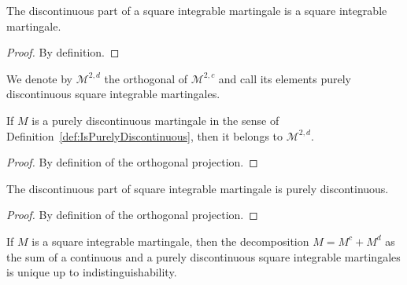 \begin{lemma}\label{lem:isSquareIntegrable_discontinuousPart}
  \leanok
The discontinuous part of a square integrable martingale is a square integrable martingale.
\end{lemma}

\begin{proof}
  \leanok
By definition.
\end{proof}


\begin{definition}\label{def:discontinuousSquareIntegrable}
  \leanok
We denote by $\mathcal{M}^{2,d}$ the orthogonal of $\mathcal{M}^{2,c}$ and call its elements purely discontinuous square integrable martingales.
\end{definition}


\begin{lemma}\label{lem:mem_discontinuousSquareIntegrable}
  \leanok
If $M$ is a purely discontinuous martingale in the sense of Definition~\ref{def:IsPurelyDiscontinuous}, then it belongs to $\mathcal{M}^{2,d}$.
\end{lemma}

\begin{proof}
  \leanok
By definition of the orthogonal projection.
\end{proof}


\begin{lemma}\label{lem:isPurelyDiscontinuous_discontinuousPart}
  \leanok
The discontinuous part of square integrable martingale is purely discontinuous.
\end{lemma}

\begin{proof}
  \leanok
By definition of the orthogonal projection.
\end{proof}


\begin{lemma}\label{lem:unique_continuousPart}
  \leanok
If $M$ is a square integrable martingale, then the decomposition $M = M^c + M^d$ as the sum of a continuous and a purely discontinuous square integrable martingales is unique up to indistinguishability.
\end{lemma}

